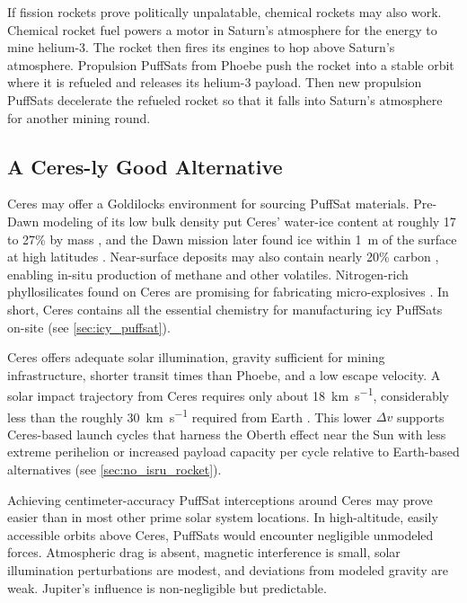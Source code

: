 \documentclass{article}
\newcommand{\deltav}{\Delta v}
\begin{document}
If fission rockets prove politically unpalatable, chemical rockets may also work.   Chemical rocket fuel powers a motor in Saturn's atmosphere for the energy to mine helium-3.  The rocket then fires its engines to hop above Saturn's atmosphere.   Propulsion PuffSats from Phoebe push the rocket into a stable orbit where it is refueled and releases its helium-3 payload.  Then new propulsion PuffSats decelerate the refueled rocket so that it falls into Saturn's atmosphere for another mining round.

\subsection{A Ceres-ly Good Alternative}\label{sec:ceresly_good}
Ceres may offer a Goldilocks environment for sourcing PuffSat materials. Pre-Dawn modeling of its low bulk density put Ceres' water-ice content at roughly 17 to 27\% by mass \cite{mccord_sotin2005ceres}, and the Dawn mission later found ice within \SI{1}{\meter} of the surface at high latitudes \cite{prettyman2017dawn_ceres_water}. Near-surface deposits may also contain nearly 20\% carbon \cite{marchi2019_ceres_carbon}, enabling in-situ production of methane and other volatiles. Nitrogen-rich phyllosilicates found on Ceres are promising for fabricating micro-explosives \cite{desanctis2015_ceres_ammoniated_phyllosilicates}. In short, Ceres contains all the essential chemistry for manufacturing icy PuffSats on-site (see \autoref{sec:icy_puffsat}).

Ceres offers adequate solar illumination, gravity sufficient for mining infrastructure, shorter transit times than Phoebe, and a low escape velocity. A solar impact trajectory from Ceres requires only about \SI{18}{\kilo\meter\per\second}, considerably less than the roughly \SI{30}{\kilo\meter\per\second} required from Earth \cite{Katz_aim_is_all_you_need_2025}. This lower $\deltav$ supports Ceres-based launch cycles that harness the Oberth effect near the Sun with less extreme perihelion or increased payload capacity per cycle relative to Earth-based alternatives (see \autoref{sec:no_isru_rocket}).

Achieving centimeter-accuracy PuffSat interceptions around Ceres may prove easier than in most other prime solar system locations. In high-altitude, easily accessible orbits above Ceres, PuffSats would encounter negligible unmodeled forces. Atmospheric drag is absent, magnetic interference is small, solar illumination perturbations are modest, and deviations from modeled gravity are weak. Jupiter's influence is non-negligible but predictable. 
\end{document}
